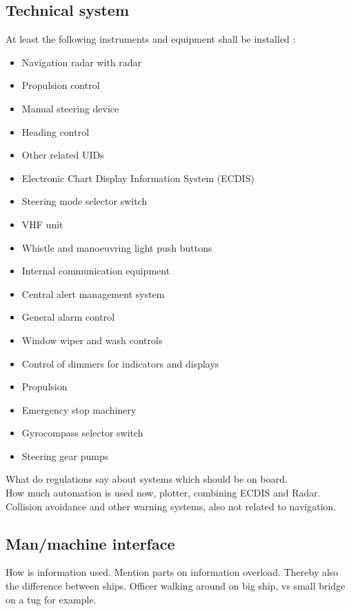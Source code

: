 \subsection{Technical system}
At least the following instruments and equipment shall be installed \cite{DNVGL2011}: 
\begin{multicols}{2}
	\begin{itemize}
		\item Navigation radar with radar
		\item Propulsion control
		\item Manual steering device
		\item Heading control
		\item Other related \ac{UID}s
		\item Electronic Chart Display Information System (ECDIS)
		\item Steering mode selector switch
		\item VHF unit
		\item Whistle and manoeuvring light push buttons
		\item Internal communication equipment
		\item Central alert management system
		\item General alarm control
		\item Window wiper and wash controls
		\item Control of dimmers for indicators and displays
		\item Propulsion
		\item Emergency stop machinery
		\item Gyrocompass selector switch
		\item Steering gear pumps
	\end{itemize}
\end{multicols}


What do regulations say about systems which should be on board. \\
How much automation is used now, plotter, combining ECDIS and Radar. \\
Collision avoidance and other warning systems, also not related to navigation.


\subsection{Man/machine interface}
How is information used. Mention parts on information overload. Thereby also the difference between ships. Officer walking around on big ship, vs small bridge on a tug for example.

